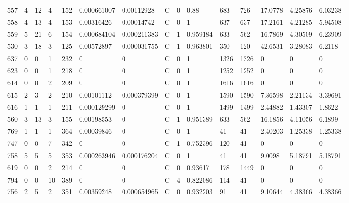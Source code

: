 \begin{latin}
\begin{longtable}{lllllllllllllll}
	557 & 4  & 12  & 4  & 152 & 0.000661007    & 0.00112928     & C & 0  & 0.88     & 683  & 726  & 17.0778 & 4.25876 & 6.03238 \\
	558 & 4  & 13  & 4  & 153 & 0.00316426     & 0.00014742     & C & 0  & 1        & 637  & 637  & 17.2161 & 4.21285 & 5.94508 \\
	559 & 5  & 21  & 6  & 154 & 0.000684104    & 0.000211383    & C & 1  & 0.959184 & 633  & 562  & 16.7869 & 4.30509 & 6.23909 \\
	530 & 3  & 18  & 3  & 125 & 0.00572897     & 0.000031755    & C & 1  & 0.963801 & 350  & 120  & 42.6531 & 3.28083 & 6.2118  \\
	637 & 0  & 0   & 1  & 232 & 0              & 0              & C & 0  & 1        & 1326 & 1326 & 0       & 0       & 0       \\
	623 & 0  & 0   & 1  & 218 & 0              & 0              & C & 0  & 1        & 1252 & 1252 & 0       & 0       & 0       \\
	614 & 0  & 0   & 2  & 209 & 0              & 0              & C & 0  & 1        & 1616 & 1616 & 0       & 0       & 0       \\
	615 & 2  & 3   & 2  & 210 & 0.00101112     & 0.000379399    & C & 0  & 1        & 1590 & 1590 & 7.86598 & 2.21134 & 3.39691 \\
	616 & 1  & 1   & 1  & 211 & 0.000129299    & 0              & C & 0  & 1        & 1499 & 1499 & 2.44882 & 1.43307 & 1.8622  \\
	560 & 3  & 13  & 3  & 155 & 0.00198553     & 0              & C & 1  & 0.951389 & 633  & 562  & 16.1856 & 4.11056 & 6.1899  \\
	769 & 1  & 1   & 1  & 364 & 0.00039846     & 0              & C & 0  & 1        & 41   & 41   & 2.40203 & 1.25338 & 1.25338 \\
	747 & 0  & 0   & 7  & 342 & 0              & 0              & C & 1  & 0.752396 & 120  & 41   & 0       & 0       & 0       \\
	758 & 5  & 5   & 5  & 353 & 0.000263946    & 0.000176204    & C & 0  & 1        & 41   & 41   & 9.0098  & 5.18791 & 5.18791 \\
	619 & 0  & 0   & 2  & 214 & 0              & 0              & C & 0  & 0.93617  & 178  & 1449 & 0       & 0       & 0       \\
	794 & 0  & 0   & 10 & 389 & 0              & 0              & C & 4  & 0.822086 & 114  & 41   & 0       & 0       & 0       \\
	756 & 2  & 5   & 2  & 351 & 0.00359248     & 0.000654965    & C & 0  & 0.932203 & 91   & 41   & 9.10644 & 4.38366 & 4.38366 \\

\end{longtable}
\end{latin}
